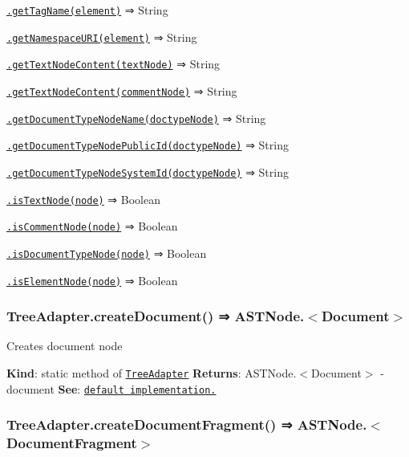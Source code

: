 \begin{DoxyItemize}
\begin{DoxyItemize}
\item \href{#TreeAdapter.getTagName}{\tt .get\+Tag\+Name(element)} ⇒ {\ttfamily String}
\item \href{#TreeAdapter.getNamespaceURI}{\tt .get\+Namespace\+U\+R\+I(element)} ⇒ {\ttfamily String}
\item \href{#TreeAdapter.getTextNodeContent}{\tt .get\+Text\+Node\+Content(text\+Node)} ⇒ {\ttfamily String}
\item \href{#TreeAdapter.getTextNodeContent}{\tt .get\+Text\+Node\+Content(comment\+Node)} ⇒ {\ttfamily String}
\item \href{#TreeAdapter.getDocumentTypeNodeName}{\tt .get\+Document\+Type\+Node\+Name(doctype\+Node)} ⇒ {\ttfamily String}
\item \href{#TreeAdapter.getDocumentTypeNodePublicId}{\tt .get\+Document\+Type\+Node\+Public\+Id(doctype\+Node)} ⇒ {\ttfamily String}
\item \href{#TreeAdapter.getDocumentTypeNodeSystemId}{\tt .get\+Document\+Type\+Node\+System\+Id(doctype\+Node)} ⇒ {\ttfamily String}
\item \href{#TreeAdapter.isTextNode}{\tt .is\+Text\+Node(node)} ⇒ {\ttfamily Boolean}
\item \href{#TreeAdapter.isCommentNode}{\tt .is\+Comment\+Node(node)} ⇒ {\ttfamily Boolean}
\item \href{#TreeAdapter.isDocumentTypeNode}{\tt .is\+Document\+Type\+Node(node)} ⇒ {\ttfamily Boolean}
\item \href{#TreeAdapter.isElementNode}{\tt .is\+Element\+Node(node)} ⇒ {\ttfamily Boolean}
\end{DoxyItemize}
\end{DoxyItemize}

\label{_TreeAdapter.createDocument}%
 \subsubsection*{Tree\+Adapter.\+create\+Document() ⇒ {\ttfamily A\+S\+T\+Node.$<$Document$>$}}

Creates document node

{\bfseries Kind}\+: static method of {\ttfamily \href{#TreeAdapter}{\tt Tree\+Adapter}} {\bfseries Returns}\+: {\ttfamily A\+S\+T\+Node.$<$Document$>$} -\/ document {\bfseries See}\+: \href{https://github.com/inikulin/parse5/blob/tree-adapter-docs-rev/lib/tree_adapters/default.js#L19}{\tt default implementation.} \label{_TreeAdapter.createDocumentFragment}%
 \subsubsection*{Tree\+Adapter.\+create\+Document\+Fragment() ⇒ {\ttfamily A\+S\+T\+Node.$<$Document\+Fragment$>$}}

